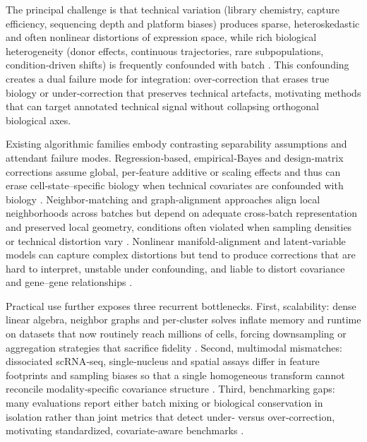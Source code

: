 \documentclass{article}
\begin{document}
The principal challenge is that technical variation (library chemistry, capture efficiency, sequencing depth and platform biases) produces sparse, heteroskedastic and often nonlinear distortions of expression space, while rich biological heterogeneity (donor effects, continuous trajectories, rare subpopulations, condition‑driven shifts) is frequently confounded with batch \citep{Svensson2017ExponentialSO,Hie2019EfficientIO,Grn2016DeNP,Richards2021ACO}. This confounding creates a dual failure mode for integration: over‑correction that erases true biology or under‑correction that preserves technical artefacts, motivating methods that can target annotated technical signal without collapsing orthogonal biological axes.

Existing algorithmic families embody contrasting separability assumptions and attendant failure modes. Regression‑based, empirical‑Bayes and design‑matrix corrections assume global, per‑feature additive or scaling effects and thus can erase cell‑state–specific biology when technical covariates are confounded with biology \citep{Li2022FastIntegrationAV,Lee2023BenchmarkingAF}. Neighbor‑matching and graph‑alignment approaches align local neighborhoods across batches but depend on adequate cross‑batch representation and preserved local geometry, conditions often violated when sampling densities or technical distortion vary \citep{Polaski2019BBKNNFB,Zhou2023AccurateIO}. Nonlinear manifold‑alignment and latent‑variable models can capture complex distortions but tend to produce corrections that are hard to interpret, unstable under confounding, and liable to distort covariance and gene–gene relationships \citep{McInnes2018UMAPUM,Xiong2021ConstructionOC,Stegle2012UsingPE,Xu2023MASIEF}.

Practical use further exposes three recurrent bottlenecks. First, scalability: dense linear algebra, neighbor graphs and per‑cluster solves inflate memory and runtime on datasets that now routinely reach millions of cells, forcing downsampling or aggregation strategies that sacrifice fidelity \citep{Bilous2021MetacellsUL,Hie2024ScanoramaIL}. Second, multimodal mismatches: dissociated scRNA‑seq, single‑nucleus and spatial assays differ in feature footprints and sampling biases so that a single homogeneous transform cannot reconcile modality‑specific covariance structure \citep{Azizi2018SingleCellMO,Galow2020IntegrativeCA,Baron2016AST}. Third, benchmarking gaps: many evaluations report either batch mixing or biological conservation in isolation rather than joint metrics that detect under‑ versus over‑correction, motivating standardized, covariate‑aware benchmarks \citep{Lein2007GenomewideAO,Der2019TubularCA,Rocque2021CreationOA}.
\end{document}
